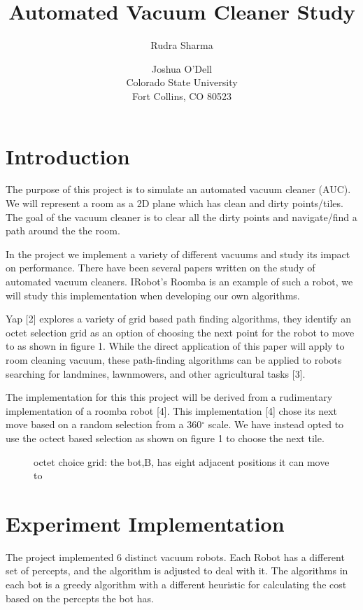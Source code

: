 \documentclass[letterpaper]{article}
\title{Automated Vacuum Cleaner Study}
\author{Rudra Sharma \and Joshua O'Dell \\ Colorado State University \\ Fort Collins, CO 80523 }
\begin{document}
\maketitle

\section{Introduction}

The purpose of this project is to simulate an automated vacuum cleaner (AUC). We will represent a room as a 2D plane which has clean and dirty points/tiles. The goal of the vacuum cleaner is to clear all the dirty points and navigate/find a path around the the room.

In the project we implement a variety of different vacuums and study its impact on performance. There have been several papers written on the study of automated vacuum cleaners. IRobot’s Roomba is an example of such a robot, we will study this implementation when developing our own algorithms.

Yap [2] explores a variety of grid based path finding algorithms, they identify an octet selection grid as an option of choosing the next point for the robot to move to as shown in figure 1. While the direct application of this paper will apply to room cleaning vacuum, these path-finding algorithms can be applied to robots searching for landmines, lawnmowers, and other agricultural tasks [3]. 

The implementation for this this project will be derived from a rudimentary implementation of a roomba robot [4]. This implementation [4] chose its next move based on a random selection from a 360$^{\circ}$ scale. We have instead opted to use the octect based selection as shown on figure 1 to choose the next tile. 

\begin{figure}[h]
\caption{ octet choice grid: the bot,B, has eight adjacent positions it can move to}
\label{figure:1}
\end{figure}
\section{Experiment Implementation}

The project implemented 6 distinct vacuum robots.  Each Robot has a different set of percepts, and the algorithm is adjusted to deal with it. The algorithms in each bot is a greedy algorithm with a different heuristic for calculating the cost based on the percepts the bot has. 
\end{document}
